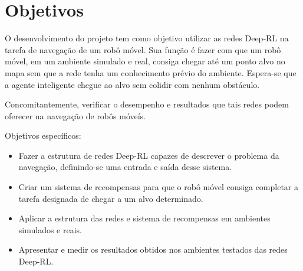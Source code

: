 \section{Objetivos}

O desenvolvimento do projeto tem como objetivo utilizar as redes Deep-RL na tarefa de navegação de um robô móvel. Sua função é fazer com que um robô móvel, em um ambiente simulado e real, consiga chegar até um ponto alvo no mapa sem que a rede tenha um conhecimento prévio do ambiente. Espera-se que a agente inteligente chegue ao alvo sem colidir com nenhum obstáculo.

Concomitantemente, verificar o desempenho e resultados que tais redes podem oferecer na navegação de robôs móveís.

Objetivos específicos:
\begin{itemize}
\item Fazer a estrutura de redes Deep-RL capazes de descrever o problema da navegação, definindo-se uma entrada e saída desse sistema.
\item Criar um sistema de recompensas para que o robô móvel consiga completar a tarefa designada de chegar a um alvo determinado.
\item Aplicar a estrutura das redes e sistema de recompensas em ambientes simulados e reais.
\item Apresentar e medir os resultados obtidos nos ambientes testados das redes Deep-RL.
\end{itemize}








